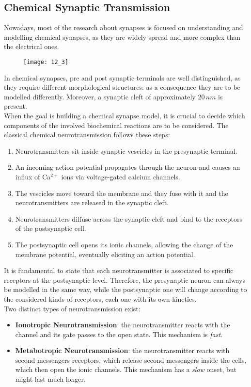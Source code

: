 \subsection{Chemical Synaptic Transmission}
Nowadays, most of the research about synapses is focused on understanding and modelling
chemical synapses, as they are widely spread and more complex than the electrical ones.
\begin{figure}[H]
    \texttt{[image: 12\_3]}
    \centering
\end{figure}
In chemical synapses, pre and post synaptic terminals are well distinguished, as they
require different morphological structures: as a consequence they are to be
modelled differently. Moreover, a synaptic cleft of approximately \(20\,nm\) is present.\\
When the goal is building a chemical synapse model, it is crucial to decide which
components of the involved biochemical reactions are to be considered. The classical
chemical neurotransmission follows these steps:
\begin{enumerate}
    \item Neurotransmitters sit inside synaptic vescicles in the presynaptic terminal.
    \item An incoming action potential propagates through the neuron and causes an influx
    of Ca\({}^{2+}\) ions via voltage-gated calcium channels.
    \item The vescicles move toward the membrane and they fuse with it and the neurotransmitters
    are released in the synaptic cleft.
    \item Neurotransmitters diffuse across the synaptic cleft and bind to the receptors of
    the postsynaptic cell.
    \item The postsynaptic cell opens its ionic channels, allowing the change of the membrane potential,
    eventually eliciting an action potential.
\end{enumerate}
It is fundamental to state that each neurotransmitter is associated to specific receptors at the
postsynaptic level. Therefore, the presynaptic neuron can always be modelled in the same way,
while the postsynaptic one will change according to the considered kinds of receptors, each one
with its own kinetics.\\
Two distinct types of neurotransmission exist:
\begin{itemize}
    \item \textbf{Ionotropic Neurotransmission}: the neurotransmitter reacts with the channel and its
    gate passes to the open state. This mechanism is \textit{fast}.
    \item \textbf{Metabotropic Neurotransmission}: the neurotransmitter reacts with second messengers
    receptors, which release second messengers inside the cells, which then open the ionic channels.
    This mechanism has a \textit{slow} onset, but might last much longer.
\end{itemize}
